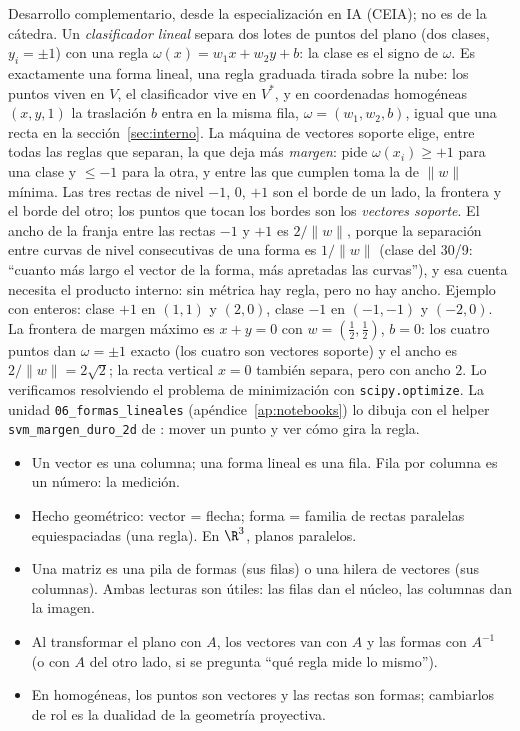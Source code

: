 \begin{idea}
Desarrollo complementario, desde la especialización en IA (CEIA); no es de la cátedra. Un
\emph{clasificador lineal} separa dos lotes de puntos del plano (dos clases, \(y_i=\pm1\))
con una regla \(\omega(x)=w_1x+w_2y+b\): la clase es el signo de \(\omega\). Es exactamente
una forma lineal, una regla graduada tirada sobre la nube: los puntos viven en \(V\), el
clasificador vive en \(V^{*}\), y en coordenadas homogéneas \((x,y,1)\) la traslación \(b\)
entra en la misma fila, \(\omega=(w_1,w_2,b)\), igual que una recta en la
sección~\ref{sec:interno}. La máquina de vectores soporte elige, entre todas las reglas
que separan, la que deja más \emph{margen}: pide \(\omega(x_i)\ge+1\) para una clase y
\(\le-1\) para la otra, y entre las que cumplen toma la de \(\|w\|\) mínima. Las tres
rectas de nivel \(-1\), \(0\), \(+1\) son el borde de un lado, la frontera y el borde del
otro; los puntos que tocan los bordes son los \emph{vectores soporte}. El ancho de la
franja entre las rectas \(-1\) y \(+1\) es \(2/\|w\|\), porque la separación entre
curvas de nivel consecutivas de una forma es \(1/\|w\|\) (clase del 30/9: ``cuanto más
largo el vector de la forma, más apretadas las curvas''), y esa cuenta necesita el
producto interno: sin métrica hay regla, pero no hay ancho. Ejemplo con enteros: clase
\(+1\) en \((1,1)\) y \((2,0)\), clase \(-1\) en \((-1,-1)\) y \((-2,0)\). La frontera
de margen máximo es \(x+y=0\) con \(w=(\tfrac12,\tfrac12)\), \(b=0\): los cuatro puntos
dan \(\omega=\pm1\) exacto (los cuatro son vectores soporte) y el ancho es
\(2/\|w\|=2\sqrt2\); la recta vertical \(x=0\) también separa, pero con ancho \(2\). Lo
verificamos resolviendo el problema de minimización con \texttt{scipy.optimize}. La unidad
\texttt{06\_formas\_lineales} (apéndice~\ref{ap:notebooks}) lo dibuja con el helper
\texttt{svm\_margen\_duro\_2d} de : mover un punto y ver cómo gira la regla.
\end{idea}

\begin{resultado}
\begin{itemize}
  \item Un vector es una columna; una forma lineal es una fila. Fila por columna es un
  número: la medición.
  \item Hecho geométrico: vector = flecha; forma = familia de rectas paralelas
  equiespaciadas (una regla). En \(\R^3\), planos paralelos.
  \item Una matriz es una pila de formas (sus filas) o una hilera de vectores (sus
  columnas). Ambas lecturas son útiles: las filas dan el núcleo, las columnas dan la imagen.
  \item Al transformar el plano con \(A\), los vectores van con \(A\) y las formas con
  \(A^{-1}\) (o con \(A\) del otro lado, si se pregunta ``qué regla mide lo mismo'').
  \item En homogéneas, los puntos son vectores y las rectas son formas; cambiarlos de rol
  es la dualidad de la geometría proyectiva.
\end{itemize}
\end{resultado}

